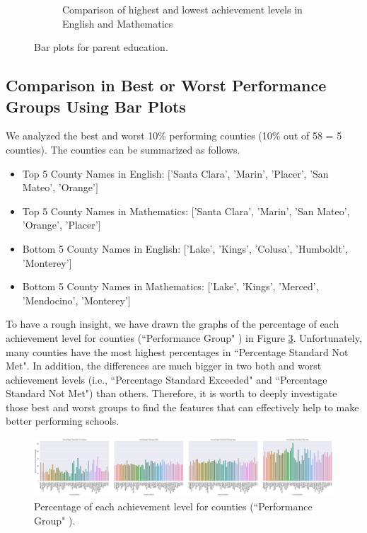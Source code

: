 \documentclass[11pt]{article}
\begin{document}
\begin{figure}[h!]
\begin{subfigure}{0.6\textwidth}
         \caption{Comparison of highest and lowest achievement levels 
in English and Mathematics}
         \label{fig:Education_two}
\end{subfigure}
\caption{Bar plots for parent education.}
\label{fig:all_Education}
\end{figure}


\subsection{Comparison in Best or Worst Performance Groups Using Bar Plots}
\label{Comparison for Top and Low Performance Groups Using Bar Plots}

We analyzed the best and worst 10\% performing counties (10\% out of 58 = 5 counties). The counties can be summarized as follows.
\begin{itemize}
\item Top 5 County Names in English: $[$'Santa Clara', 'Marin', 'Placer', 'San Mateo', 'Orange'$]$
\item Top 5 County Names in Mathematics: $[$'Santa Clara', 'Marin', 'San Mateo', 'Orange', 'Placer'$]$
\item Bottom 5 County Names in English: $[$'Lake', 'Kings', 'Colusa', 'Humboldt', 'Monterey'$]$
\item Bottom 5 County Names in Mathematics: $[$'Lake', 'Kings', 'Merced', 'Mendocino', 'Monterey'$]$
\end{itemize}

To have a rough insight, we have drawn the graphs of the percentage of each achievement level 
for counties (``Performance Group" ) in Figure \ref{fig:pct_each_performance_group}. 
Unfortunately, many counties have the most highest percentages in ``Percentage Standard Not Met". In addition, the differences are much bigger in two both and worst achievement levels (i.e., ``Percentage Standard Exceeded" and ``Percentage Standard Not Met") than others. Therefore, it is worth to deeply investigate those best and worst groups to find the features that can effectively help to make better performing schools.

\begin{figure}[h!]
\centering 
\includegraphics[width=\textwidth]{output_46_0.png}
\caption{Percentage of each achievement level for counties (``Performance Group" ).}
  \label{fig:pct_each_performance_group}
\end{figure}
\end{document}
